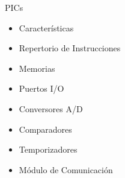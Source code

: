 \documentclass[handout,xcolor=dvipsnames]{beamer}
\begin{document}
\begin{frame}{PICs}
\begin{block}{}
\begin{itemize}
 \item Características
 \item Repertorio de Instrucciones
 \item Memorias
 \item Puertos I/O
 \item Conversores A/D
 \item Comparadores
 \item Temporizadores
 \item Módulo de Comunicación
\end{itemize}
\end{block}
\end{frame}

%
%
%
\end{document}
